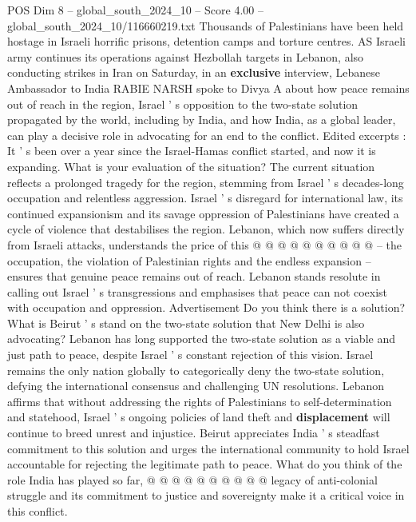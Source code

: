 \begin{textsample}{POS Dim 8 – global\_south\_2024\_10 – Score 4.00 – global\_south\_2024\_10/116660219.txt}  \label{ex:f8_pos_304}
Thousands of Palestinians have been held hostage in Israeli horrific prisons, detention camps and torture centres.
AS Israeli army continues its operations against Hezbollah targets in Lebanon, also conducting strikes in Iran on Saturday, in an \textbf{exclusive} interview, Lebanese Ambassador to India RABIE NARSH spoke to Divya A about how peace remains out of reach in the region, Israel ' s opposition to the two-state solution propagated by the world, including by India, and how India, as a global leader, can play a decisive role in advocating for an end to the conflict.
Edited excerpts : It ' s been over a year since the Israel-Hamas conflict started, and now it is expanding.
What is your evaluation of the situation?
The current situation reflects a prolonged tragedy for the region, stemming from Israel ' s decades-long occupation and relentless aggression.
Israel ' s disregard for international law, its continued expansionism and its savage oppression of Palestinians have created a cycle of violence that destabilises the region.
Lebanon, which now suffers directly from Israeli attacks, understands the price of this @ @ @ @ @ @ @ @ @ @ -- the occupation, the violation of Palestinian rights and the endless expansion -- ensures that genuine peace remains out of reach.
Lebanon stands resolute in calling out Israel ' s transgressions and emphasises that peace can not coexist with occupation and oppression.
Advertisement Do you think there is a solution?
What is Beirut ' s stand on the two-state solution that New Delhi is also advocating?
Lebanon has long supported the two-state solution as a viable and just path to peace, despite Israel ' s constant rejection of this vision.
Israel remains the only nation globally to categorically deny the two-state solution, defying the international consensus and challenging UN resolutions.
Lebanon affirms that without addressing the rights of Palestinians to self-determination and statehood, Israel ' s ongoing policies of land theft and \textbf{displacement} will continue to breed unrest and injustice.
Beirut appreciates India ' s steadfast commitment to this solution and urges the international community to hold Israel accountable for rejecting the legitimate path to peace.
What do you think of the role India has played so far, @ @ @ @ @ @ @ @ @ @ legacy of anti-colonial struggle and its commitment to justice and sovereignty make it a critical voice in this conflict.

\end{textsample}
